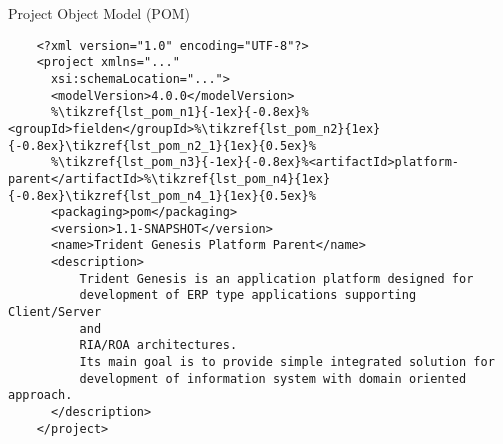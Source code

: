   \begin{code}{Project Object Model (POM)}{\label{lst:pom}}
    \begin{lstlisting}
    <?xml version="1.0" encoding="UTF-8"?>
    <project xmlns="..."
	  xsi:schemaLocation="...">
	  <modelVersion>4.0.0</modelVersion>
	  %\tikzref{lst_pom_n1}{-1ex}{-0.8ex}%<groupId>fielden</groupId>%\tikzref{lst_pom_n2}{1ex}{-0.8ex}\tikzref{lst_pom_n2_1}{1ex}{0.5ex}%
	  %\tikzref{lst_pom_n3}{-1ex}{-0.8ex}%<artifactId>platform-parent</artifactId>%\tikzref{lst_pom_n4}{1ex}{-0.8ex}\tikzref{lst_pom_n4_1}{1ex}{0.5ex}%
	  <packaging>pom</packaging>
	  <version>1.1-SNAPSHOT</version>
	  <name>Trident Genesis Platform Parent</name>
	  <description>
		  Trident Genesis is an application platform designed for
		  development of ERP type applications supporting Client/Server
		  and
		  RIA/ROA architectures.
		  Its main goal is to provide simple integrated solution for 
		  development of information system with domain oriented approach. 
	  </description>
    </project> 
    \end{lstlisting}


  \end{code}

